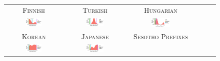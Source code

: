 \documentclass[11pt,letterpaper]{article}
\newcommand\becky[1]{{\color{blue}(#1)}}
\begin{document}



\begin{figure}
    \centering
    \begin{tabular}{cccccc}
    \textsc{Finnish} & \textsc{Turkish} & \textsc{Hungarian} \\
        \includegraphics[width=0.3\textwidth]{figures/finnish_verbs/suffixes-byMorphemes-auc-hist-heldout-Coarse-FineSurprisal-optimized.pdf}
        &
    \includegraphics[width=0.3\textwidth]{figures/turkish_verbs/suffixes-byMorphemes-auc-hist-heldout-Coarse-FineSurprisal-optimized.pdf}
    &
    \includegraphics[width=0.3\textwidth]{figures/hungarian_verbs/suffixes-byMorphemes-auc-hist-heldout-Coarse-FineSurprisal-optimized.pdf}
    \\
    \textsc{Korean} & \textsc{Japanese} & \textsc{Sesotho Prefixes} \\
    \includegraphics[width=0.3\textwidth]{figures/korean/suffixes-byMorphemes-auc-hist-heldout-Coarse-FineSurprisal-optimized.pdf}
    &
        \includegraphics[width=0.3\textwidth]{figures/japanese/suffixes-byMorphemes-auc-hist-heldout-Coarse-FineSurprisal-optimized.pdf}

\end{tabular}
\end{figure}
\end{document}
